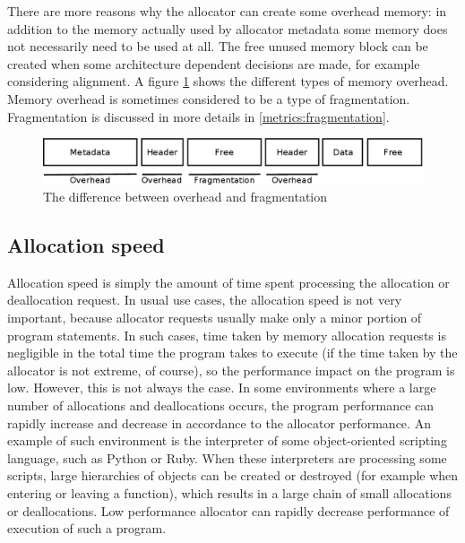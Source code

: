 There are more reasons why the allocator can create some overhead memory: in addition to the memory actually used by allocator metadata some memory does not necessarily need to be used at all. The free unused memory block can be created when some architecture dependent decisions are made, for example considering alignment. A figure \ref{fig:overhead} shows the different types of memory overhead. Memory overhead is sometimes considered to be a type of fragmentation. Fragmentation is discussed in more details in \ref{metrics:fragmentation}.

\begin{figure}[h]
\begin{center}
\includegraphics[width=1.0\textwidth,keepaspectratio]{fig/frags}
\end{center}
\caption{The difference between overhead and fragmentation}
\label{fig:overhead}
\end{figure}

\subsection{Allocation speed}

Allocation speed is simply the amount of time spent processing the allocation or deallocation request. In usual use cases, the allocation speed is not very important, because allocator requests usually make only a minor portion of program statements. In such cases, time taken by memory allocation requests is negligible in the total time the program takes to execute (if the time taken by the allocator is not extreme, of course), so the performance impact on the program is low. However, this is not always the case. In some environments where a large number of allocations and deallocations occurs, the program performance can rapidly increase and decrease in accordance to the allocator performance. An example of such environment is the interpreter of some object-oriented scripting language, such as Python or Ruby. When these interpreters are processing some scripts, large hierarchies of objects can be created or destroyed (for example when entering or leaving a function), which results in a large chain of small allocations or deallocations. Low performance allocator can rapidly decrease performance of execution of such a program.

